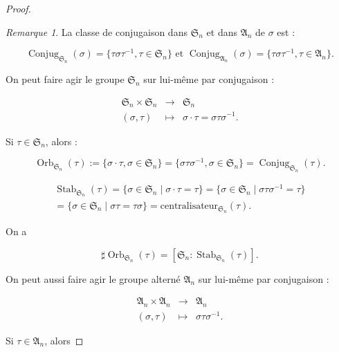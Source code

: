 \documentclass[french]{book}
\theoremstyle{definition}
\theoremstyle{remark}
\newtheorem*{remark}{Remarque}
\begin{document}
\begin{proof}
  \begin{remark}
    La classe de conjugaison dans \(\mathfrak{S}_n\) et dans \(\mathfrak{A}_n\) de \(\sigma\) est :

    \[\operatorname{Conjug}_{\mathfrak{S}_n}(\sigma) = \{ \tau \sigma \tau ^{-1}, \tau \in \mathfrak{S}_n\} \text{ et }\operatorname{Conjug}_{\mathfrak{A}_n}(\sigma) = \{ \tau \sigma \tau ^{-1}, \tau \in \mathfrak{A}_n\}. \]
  \end{remark}

  On peut faire agir le groupe \(\mathfrak{S}_n\) sur lui-même par conjugaison :

  \[\begin{matrix}
  \mathfrak{S}_n \times \mathfrak{S}_n   & \longrightarrow & \mathfrak{S}_n \\
   (\sigma, \tau) & \longmapsto & \sigma \cdot \tau = \sigma \tau \sigma ^{-1}.
  \end{matrix}\]

  Si \(\tau \in \mathfrak{S}_n\), alors :

  \[\operatorname{Orb}_{\mathfrak{S}_n}(\tau):=\{ \sigma \cdot \tau, \sigma \in \mathfrak{S}_n \} = \{ \sigma \tau \sigma ^{-1}, \sigma \in \mathfrak{S}_n \} = \operatorname{Conjug}_{\mathfrak{S}_n}(\tau).\]

  \begin{gather*}
    \operatorname{Stab}_{\mathfrak{S}_n}(\tau) = \{ \sigma \in \mathfrak{S}_n \mid \sigma \cdot \tau = \tau \} = \{ \sigma \in \mathfrak{S}_n \mid \sigma \tau \sigma ^{-1} = \tau \} \\
    = \{ \sigma \in \mathfrak{S}_n \mid \sigma \tau = \tau \sigma \} = \text{centralisateur}_{\mathfrak{S}_n}(\tau).
  \end{gather*}

  On a

  \[\sharp\operatorname{Orb}_{\mathfrak{S}_n}(\tau) = [\mathfrak{S}_n : \operatorname{Stab}_{\mathfrak{S}_n}(\tau)].\]

  On peut aussi faire agir le groupe alterné \(\mathfrak{A}_n\) sur lui-même par conjugaison :

  \[\begin{matrix}
  \mathfrak{A}_n \times \mathfrak{A}_n & \longrightarrow & \mathfrak{A}_n \\
   (\sigma,\tau) & \longmapsto & \sigma \tau \sigma ^{-1}.
  \end{matrix}\]

  Si \(\tau \in \mathfrak{A}_n\), alors


\end{proof}
\end{document}
